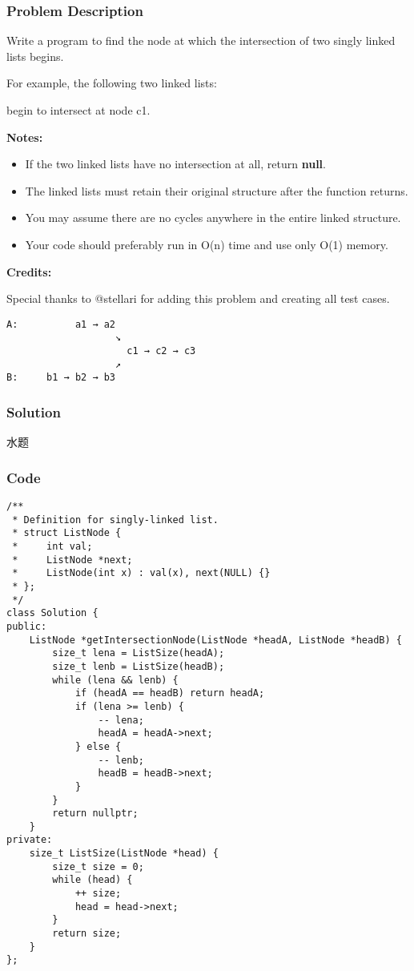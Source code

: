 \documentclass[courier]{article}
\begin{document}
\begin{CJK*}{UTF8}{gkai}
\subsubsection*{Problem Description}
Write a program to find the node at which the intersection of two singly linked lists begins.

For example, the following two linked lists:

begin to intersect at node c1.

\textbf{Notes:}

\begin{itemize}
\item If the two linked lists have no intersection at all, return \textbf{null}.
\item The linked lists must retain their original structure after the function returns. 
\item You may assume there are no cycles anywhere in the entire linked structure.
\item Your code should preferably run in O(n) time and use only O(1) memory.
\end{itemize}

\textbf{Credits:}

Special thanks to @stellari for adding this problem and creating all test cases.

\begin{verbatim}
A:          a1 → a2
                   ↘
                     c1 → c2 → c3
                   ↗            
B:     b1 → b2 → b3
\end{verbatim}


\subsubsection*{Solution}
水题

\subsubsection*{Code}
\begin{lstlisting}
/**
 * Definition for singly-linked list.
 * struct ListNode {
 *     int val;
 *     ListNode *next;
 *     ListNode(int x) : val(x), next(NULL) {}
 * };
 */
class Solution {
public:
    ListNode *getIntersectionNode(ListNode *headA, ListNode *headB) {
        size_t lena = ListSize(headA);
        size_t lenb = ListSize(headB);
        while (lena && lenb) {
            if (headA == headB) return headA;
            if (lena >= lenb) {
                -- lena;
                headA = headA->next;
            } else {
                -- lenb;
                headB = headB->next;
            }
        }
        return nullptr;
    }
private:
    size_t ListSize(ListNode *head) {
        size_t size = 0;
        while (head) {
            ++ size;
            head = head->next;
        }
        return size;
    }
}; 
\end{lstlisting}



\end{CJK*}
\end{document}
